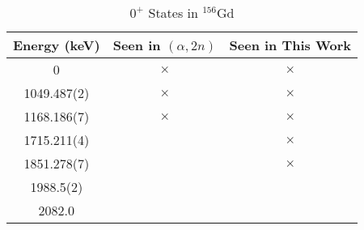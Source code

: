 \begin{table}[]
    \centering
    \caption{$0^+$ States in $^{156}$Gd}
    \label{tab:0plus_156}
    \begin{tabular}{c|c|c}
        Energy (keV) &  Seen in $(\alpha,2n)$ & Seen in This Work  \\
        \toprule
        0 & $\times$ & $\times$\\
        1049.487(2) & $\times$ & $\times$\\
        1168.186(7) & $\times$ & $\times$\\
        1715.211(4) & & $\times$\\
        1851.278(7) & & $\times$\\
        1988.5(2) & & \\
        2082.0 & & \\
        \bottomrule
    \end{tabular}
\end{table}